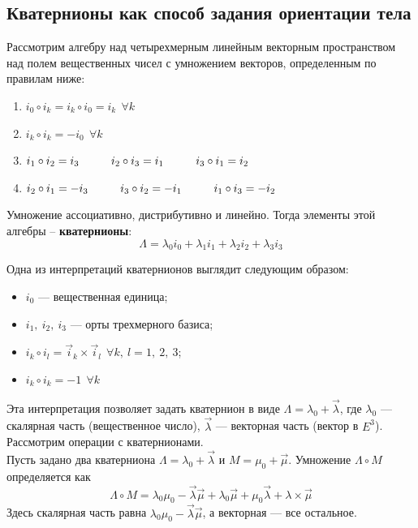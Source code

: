 \subsection{Кватернионы как способ задания ориентации тела}
\begin{definition}
    Рассмотрим алгебру над четырехмерным линейным векторным пространством над полем вещественных чисел с умножением векторов, определенным по правилам ниже:
    \begin{enumerate}
        \item $i_0 \circ i_k = i_k \circ i_0 = i_k~~\forall k$
        \item $i_k \circ i_k = -i_0~~\forall k$
        \item $i_1 \circ i_2 = i_3 \hspace*{1cm} i_2 \circ i_3 = i_1 \hspace*{1cm} i_3 \circ i_1 = i_2$
        \item $i_2 \circ i_1 = -i_3 \hspace*{1cm} i_3 \circ i_2 = -i_1 \hspace*{1cm} i_1 \circ i_3 = -i_2$
    \end{enumerate}
    Умножение ассоциативно, дистрибутивно и линейно. Тогда элементы этой алгебры -- \textbf{кватернионы}:
    \[
    \Lambda = \lambda_0 i_0 + \lambda_1 i_1 + \lambda_2 i_2 + \lambda_3 i_3
    \]
\end{definition}

Одна из интерпретаций кватернионов выглядит следующим образом:
\begin{itemize}
    \item $i_0$ --- вещественная единица;
    \item $i_1,~i_2,~i_3$ --- орты трехмерного базиса;
    \item $i_k \circ i_l = \vec{i}_k \times \vec{i}_l ~~ \forall k,~l = 1,~2,~3$;
    \item $i_k \circ i_k = -1~~\forall k$
\end{itemize}

Эта интерпретация позволяет задать кватернион в виде $\Lambda = \lambda_0 + \vec{\lambda}$, где $\lambda_0$ --- скалярная часть (вещественное число), $\vec{\lambda}$ --- векторная часть (вектор в $E^3$).\\

Рассмотрим операции с кватернионами.\\

Пусть задано два кватерниона $\Lambda = \lambda_0 + \vec{\lambda}$ и $M = \mu_0 + \vec{\mu}$. Умножение $\Lambda \circ M$ определяется как
\[
\Lambda \circ M = \lambda_0\mu_0 - \vec{\lambda}\vec{\mu} + \lambda_0\vec{\mu} + \mu_0\vec{\lambda} + \lambda\times\vec{\mu}\]
Здесь скалярная часть равна $\lambda_0\mu_0 - \vec{\lambda}\vec{\mu}$, а векторная --- все остальное.\\

